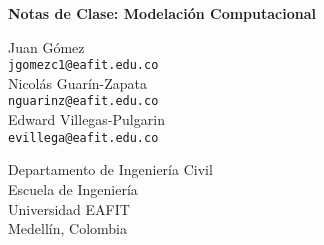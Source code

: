 \begin{titlepage}
\centering
\Large{\textbf{Notas de Clase: Modelación Computacional}}\\
\vspace{6cm}

\large
Juan Gómez\\
\texttt{jgomezc1@eafit.edu.co}\\
Nicolás Guarín-Zapata\\
\texttt{nguarinz@eafit.edu.co}\\
Edward Villegas-Pulgarin\\
\texttt{evillega@eafit.edu.co}\\
\vspace{5cm}

Departamento de Ingeniería Civil\\
Escuela de Ingeniería\\
Universidad EAFIT\\
Medellín, Colombia\\
\the\year
\end{titlepage}